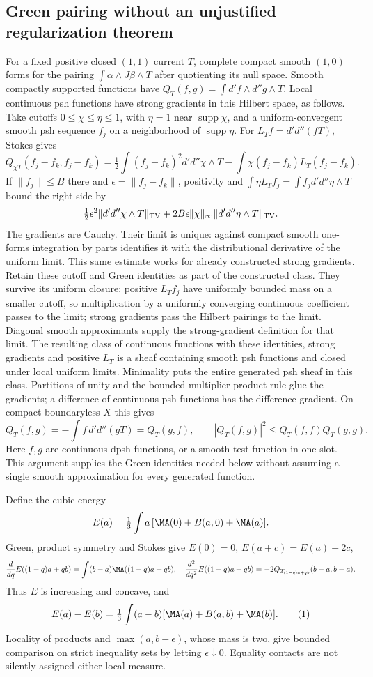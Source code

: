 \subsection{Green pairing without an unjustified regularization theorem}
For a fixed positive closed $(1,1)$ current $T$, complete compact smooth
$(1,0)$ forms for the pairing $\int\alpha\wedge J\beta\wedge T$ after
quotienting its null space. Smooth compactly supported functions have
$Q_T(f,g)=\int d'f\wedge d''g\wedge T$. Local continuous psh functions
have strong gradients in this Hilbert space, as follows.
Take cutoffs $0\le\chi\le\eta\le1$, with $\eta=1$ near
$\operatorname{supp}\chi$, and a uniform-convergent smooth psh sequence
$f_j$ on a neighborhood of $\operatorname{supp}\eta$.
For $L_T f=d'd''(fT)$, Stokes gives
\[
 Q_{\chi T}(f_j-f_k,f_j-f_k)
 =\tfrac12\int(f_j-f_k)^2d'd''\chi\wedge T
       -\int\chi(f_j-f_k)L_T(f_j-f_k).
\]
If $\|f_j\|\le B$ there and $\epsilon=\|f_j-f_k\|$, positivity and
$\int\eta L_Tf_j=\int f_jd'd''\eta\wedge T$ bound the right side by
\[
 \tfrac12\epsilon^2\|d'd''\chi\wedge T\|_{\rm TV}
 +2B\epsilon\|\chi\|_\infty\|d'd''\eta\wedge T\|_{\rm TV}.
\]
The gradients are Cauchy. Their limit is unique: against compact smooth
one-forms integration by parts identifies it with the distributional derivative
of the uniform limit. This same estimate works for already constructed strong
gradients. Retain these cutoff and Green identities as part of the constructed class.
They survive its uniform closure: positive $L_Tf_j$ have uniformly bounded
mass on a smaller cutoff, so multiplication by a uniformly converging
continuous coefficient passes to the limit; strong gradients pass the Hilbert
pairings to the limit. Diagonal smooth approximants supply the strong-gradient
definition for that limit. The resulting class of continuous functions with
these identities, strong gradients and positive $L_T$ is a sheaf containing
smooth psh functions and closed under local uniform limits. Minimality puts the entire generated psh sheaf in this class.
Partitions of unity and the bounded multiplier product rule glue the gradients;
a difference of continuous psh functions has the difference gradient.
On compact boundaryless $X$ this gives
\[
 Q_T(f,g)=-\int f\,d'd''(gT)=Q_T(g,f),\qquad
 |Q_T(f,g)|^2\le Q_T(f,f)Q_T(g,g).
\]
Here $f,g$ are continuous dpsh functions, or a smooth test function in one
slot. This argument supplies the Green identities needed below without
assuming a single smooth approximation for every generated function.

Define the cubic energy
\[
 E(a)=\tfrac13\int a\,[\MA(0)+B(a,0)+\MA(a)].
\]
Green, product symmetry and Stokes give $E(0)=0$, $E(a+c)=E(a)+2c$,
\[
 \frac d{dq}E((1-q)a+qb)=\int(b-a)\MA((1-q)a+qb),
\quad
 \frac {d^2}{dq^2}E((1-q)a+qb)
 =-2Q_{T_{(1-q)a+qb}}(b-a,b-a).
\]
Thus $E$ is increasing and concave, and
\[
 E(a)-E(b)=\tfrac13\int(a-b)[\MA(a)+B(a,b)+\MA(b)].             \tag{1}
\]
Locality of products and $\max(a,b-\epsilon)$, whose mass is two, give
bounded comparison on strict inequality sets by letting $\epsilon\downarrow0$.
Equality contacts are not silently assigned either local measure.
